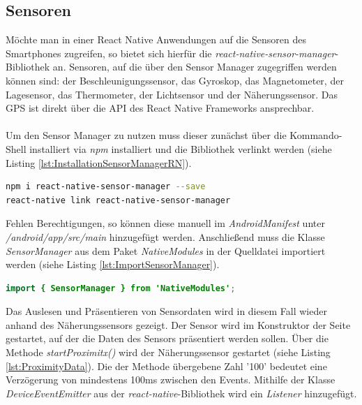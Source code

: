 \subsection*{Sensoren}

Möchte man in einer React Native Anwendungen auf die Sensoren des Smartphones zugreifen, so bietet sich hierfür die \textit{react-native-sensor-manager}-Bibliothek an. Sensoren, auf die über den Sensor Manager zugegriffen werden können sind: der Beschleunigungssensor, das Gyroskop, das Magnetometer, der Lagesensor, das Thermometer, der Lichtsensor und der Näherungssensor. Das GPS ist direkt über die API des React Native Frameworks ansprechbar. 
\\
\\
Um den Sensor Manager zu nutzen muss dieser zunächst über die Kommando-Shell installiert via \textit{npm} installiert und die Bibliothek verlinkt werden (siehe Listing \ref{lst:InstallationSensorManagerRN}).

\begin{lstlisting}[caption=Installation und Verlinkung der Bibliothek \textit{react-native-sensor-manager}, label=lst:InstallationSensorManagerRN, language=bash]
npm i react-native-sensor-manager --save
react-native link react-native-sensor-manager
\end{lstlisting}

Fehlen Berechtigungen, so können diese manuell im \textit{AndroidManifest} unter \textit{/android/app/src/main} hinzugefügt werden. Anschließend muss die Klasse \textit{SensorManager} aus dem Paket \textit{NativeModules} in der Quelldatei importiert werden (siehe Listing \ref{lst:ImportSensorManager}). 

\begin{lstlisting}[caption=Import der \textit{SensorManager}-Klasse, label=lst:ImportSensorManager, language=Java]
import { SensorManager } from 'NativeModules';
\end{lstlisting}

Das Auslesen und Präsentieren von Sensordaten wird in diesem Fall wieder anhand des Näherungssensors gezeigt. Der Sensor wird im Konstruktor der Seite gestartet, auf der die Daten des Sensors präsentiert werden sollen. Über die Methode \textit{startProximitx()} wird der Näherungssensor gestartet (siehe Listing \ref{lst:ProximityData}). Die der Methode übergebene Zahl '100' bedeutet eine Verzögerung von mindestens 100ms zwischen den Events. Mithilfe der Klasse \textit{DeviceEventEmitter} aus der \textit{react-native}-Bibliothek wird ein \textit{Listener} hinzugefügt. 
\clearpage

